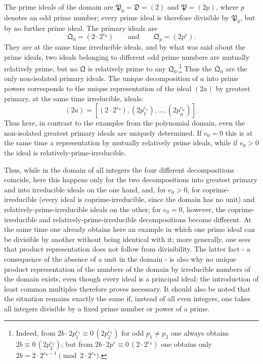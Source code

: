 \documentclass[11pt]{article}
\newcommand{\ideal}[1]{\mathfrak{#1}}
\newcommand{\eqzero}[1]{\equiv 0\,(#1)}
\begin{document}
The prime ideals of the domain are $\ideal P_0=\ideal D=(2)$ and $\ideal P=(2p)$, where $p$ denotes an odd prime number; every prime ideal is therefore divisible by $\ideal P_0$, but by no further prime ideal. The primary ideals are
\[
 \ideal Q_0=(2\cdot2^{e_0})
 \qquad\text{and}\qquad
 \ideal Q_p=(2p^e).
\]
They are at the same time irreducible ideals, and by what was said about the prime ideals, two ideals belonging to different odd prime numbers are mutually relatively prime, but no $\ideal Q$ is relatively prime to any $\ideal Q_0$.\footnote{Indeed, from $2b\cdot2p_1^{e_1}\eqzero{2p_2^{e_2}}$ for odd $p_1\ne p_2$ one always obtains $2b\eqzero{2p_2^{e_2}}$; but from $2b\cdot2p^e\eqzero{2\cdot2^{e_0}}$ one obtains only $2b=2\cdot2^{e_0-1}\pmod{2\cdot2^{e_0}}$.} Thus the $\ideal Q_0$ are the only non-isolated primary ideals. The unique decomposition of $a$ into prime powers corresponds to the unique representation of the ideal $(2a)$ by greatest primary, at the same time irreducible, ideals:
\[
 (2a)=[(2\cdot2^{e_0}),(2p_1^{e_1}),
\ldots,(2p_\mu^{e_\mu})].
\]
Thus here, in contrast to the examples from the polynomial domain, even the non-isolated greatest primary ideals are uniquely determined. If $e_0=0$ this is at the same time a representation by mutually relatively prime ideals, while if $e_0>0$ the ideal is relatively-prime-irreducible.

Thus, while in the domain of all integers the four different decompositions coincide, here this happens only for the two decompositions into greatest primary and into irreducible ideals on the one hand, and, for $e_0>0$, for coprime-irreducible (every ideal is coprime-irreducible, since the domain has no unit) and relatively-prime-irreducible ideals on the other; for $e_0=0$, however, the coprime-irreducible and relatively-prime-irreducible decompositions become different. At the same time one already obtains here an example in which one prime ideal can be divisible by another without being identical with it; more generally, one sees that product representation does not follow from divisibility. The latter fact - a consequence of the absence of a unit in the domain - is also why no unique product representation of the numbers of the domain by irreducible numbers of the domain exists, even though every ideal is a principal ideal; the introduction of least common multiples therefore proves necessary. It should also be noted that the situation remains exactly the same if, instead of all even integers, one takes all integers divisible by a fixed prime number or power of a prime.
\end{document}

